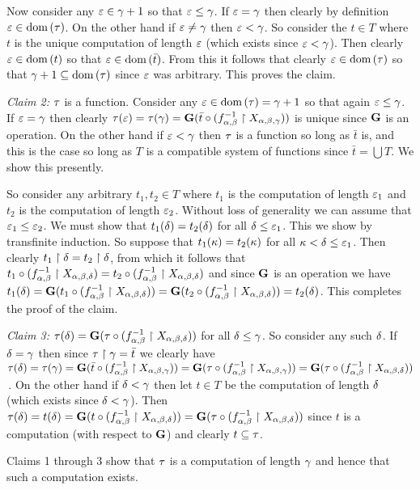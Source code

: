 {{    Now consider any $\varepsilon \in \gamma+1$ so that $\varepsilon \leq \gamma$.
    If $\varepsilon = \gamma$ then clearly by definition $\varepsilon \in \mathrm{dom}\,(\tau)$.
    On the other hand if $\varepsilon \neq \gamma$ then $\varepsilon < \gamma$.
    So consider the $t \in T$ where $t$ is the unique computation of length $\varepsilon$ (which exists since $\varepsilon < \gamma$).
    Then clearly $\varepsilon \in \mathrm{dom}\,(t)$ so that $\varepsilon \in \mathrm{dom}\,(\bar{t})$.
    From this it follows that clearly $\varepsilon \in \mathrm{dom}\,(\tau)$ so that $\gamma+1 \subseteq \mathrm{dom}\,(\tau)$ since $\varepsilon$ was arbitrary.
    This proves the claim.

    \emph{Claim 2:} $\tau$ is a function.
    Consider any $\varepsilon \in \mathrm{dom}\,(\tau) = \gamma+1$ so that again $\varepsilon \leq \gamma$.
    If $\varepsilon = \gamma$ then clearly $\tau(\varepsilon) = \tau(\gamma) = \mathbf{G}(\bar{t} \circ (f_{\alpha,\beta}^{-1} \restriction X_{\alpha,\beta,\gamma}))$ is unique since $\mathbf{G}$ is an operation.
    On the other hand if $\varepsilon < \gamma$ then $\tau$ is a function so long as $\bar{t}$ is, and this is the case so long as $T$ is a compatible system of functions since $\bar{t} = \bigcup T$.
    We show this presently.

    So consider any arbitrary $t_1, t_2 \in T$ where $t_1$ is the computation of length $\varepsilon_1$ and $t_2$ is the computation of length $\varepsilon_2$.
    Without loss of generality we can assume that $\varepsilon_1 \leq \varepsilon_2$.
    We must show that $t_1(\delta) = t_2(\delta)$ for all $\delta \leq \varepsilon_1$.
    This we show by transfinite induction.
    So suppose that $t_1(\kappa) = t_2(\kappa)$ for all $\kappa < \delta \leq \varepsilon_1$.
    Then clearly $t_1 \restriction \delta = t_2 \restriction \delta$, from which it follows that $t_1 \circ (f_{\alpha,\beta}^{-1} \restriction X_{\alpha,\beta,\delta}) = t_2 \circ (f_{\alpha,\beta}^{-1} \restriction X_{\alpha,\beta,\delta})$ and since $\mathbf{G}$ is an operation we have $t_1(\delta) = \mathbf{G}(t_1 \circ (f_{\alpha,\beta}^{-1} \restriction X_{\alpha,\beta,\delta})) = \mathbf{G}(t_2 \circ (f_{\alpha,\beta}^{-1} \restriction X_{\alpha,\beta,\delta})) = t_2(\delta)$.
    This completes the proof of the claim.

    \emph{Claim 3:} $\tau(\delta) = \mathbf{G}(\tau \circ (f_{\alpha,\beta}^{-1} \restriction X_{\alpha,\beta,\delta}))$ for all $\delta \leq \gamma$.
    So consider any such $\delta$.
    If $\delta = \gamma$ then since $\tau \restriction \gamma = \bar{t}$ we clearly have $\tau(\delta) = \tau(\gamma) = \mathbf{G}(\bar{t} \circ (f_{\alpha,\beta}^{-1} \restriction X_{\alpha,\beta,\gamma})) = \mathbf{G}(\tau \circ (f_{\alpha,\beta}^{-1} \restriction X_{\alpha,\beta,\gamma})) = \mathbf{G}(\tau \circ (f_{\alpha,\beta}^{-1} \restriction X_{\alpha,\beta,\delta}))$\,.
    On the other hand if $\delta < \gamma$ then let $t \in T$ be the computation of length $\delta$ (which exists since $\delta < \gamma$).
    Then $\tau(\delta) = t(\delta) = \mathbf{G}(t \circ (f_{\alpha,\beta}^{-1} \restriction X_{\alpha,\beta,\delta})) = \mathbf{G}(\tau \circ (f_{\alpha,\beta}^{-1} \restriction X_{\alpha,\beta,\delta}))$ since $t$ is a computation (with respect to $\mathbf{G}$) and clearly $t \subseteq \tau$.

    Claims 1 through 3 show that $\tau$ is a computation of length $\gamma$ and hence that such a computation exists.

}}
